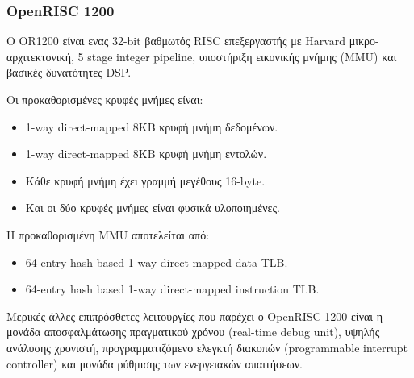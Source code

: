 \documentclass[a4paper,10pt]{article}
\numberwithin{figure}{section}
\numberwithin{table}{section}
\begin{document}
\subsubsection{OpenRISC 1200}
 Ο OR1200 είναι ενας 32-bit βαθμωτός RISC επεξεργαστής με Harvard μικρο-αρχιτεκτονική, 5 stage integer pipeline, υποστήριξη εικονικής μνήμης (MMU) και βασικές δυνατότητες
DSP. 
\newline

Οι προκαθορισμένες κρυφές μνήμες είναι:
\begin{itemize}
 \item 1-way direct-mapped 8KB κρυφή μνήμη δεδομένων. 
 \item 1-way direct-mapped 8KB κρυφή μνήμη εντολών. 
 \item Κάθε κρυφή μνήμη έχει γραμμή μεγέθους 16-byte. 
 \item Και οι δύο κρυφές μνήμες είναι φυσικά υλοποιημένες. 
\end{itemize}

Η προκαθορισμένη MMU αποτελείται από:
\begin{itemize}
 \item 64-entry hash based 1-way direct-mapped data TLB. 
 \item 64-entry hash based 1-way direct-mapped instruction TLB. 
\end{itemize}

Μερικές άλλες επιπρόσθετες λειτουργίες που παρέχει ο OpenRISC 1200 είναι η μονάδα
αποσφαλμάτωσης πραγματικού χρόνου (real-time debug unit), υψηλής ανάλυσης χρονιστή, προγραμματιζόμενο ελεγκτή διακοπών (programmable interrupt controller) και μονάδα
ρύθμισης των ενεργειακών απαιτήσεων. 
\newline
\end{document}
